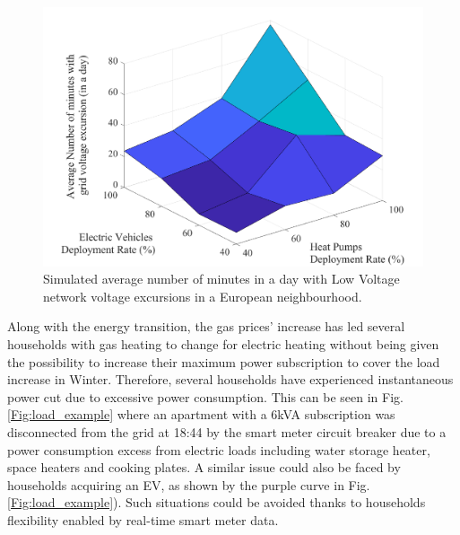 \documentclass[conference]{IEEEtran}
\begin{document}
	\begin{figure}[h]
		\centering
		\includegraphics[width=0.75\columnwidth]{Images/ReFELX_EV_HP_Impact_Map2.pdf}
		\caption{Simulated average number of minutes in a day with Low Voltage network voltage excursions in a European neighbourhood.}
		\label{Fig:voltage_excursion}
	\end{figure}
	
	Along with the energy transition, the gas prices' increase has led several households with gas heating to change for electric heating without being given the possibility to increase their maximum power subscription to cover the load increase in Winter.
%	
	 Therefore, several households have experienced instantaneous power cut due to excessive power consumption. This can be seen in Fig. \ref{Fig:load_example} where an apartment with a 6kVA subscription was disconnected from the grid at 18:44 by the smart meter circuit breaker due to a power consumption excess from electric loads including water storage heater, space heaters and cooking plates. A similar issue could also be faced by households acquiring an EV, as shown by the purple curve in  Fig. \ref{Fig:load_example}).
	  Such situations could be avoided thanks to  households flexibility enabled by real-time smart meter data. 
	
\end{document}

